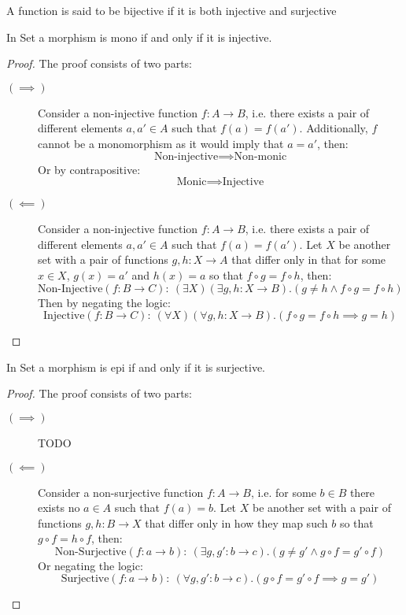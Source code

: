 \begin{definition}
  A function is said to be bijective if it is both injective and surjective
\end{definition}

\begin{theorem}
  In Set a morphism is mono if and only if it is injective.

  \begin{proof}
    The proof consists of two parts:
    \begin{description}
      \item[$(\implies)$] Consider a non-injective function $f:A\to B$, i.e.
        there exists a pair of different elements $a,a'\in A$ such that
        $f(a)=f(a')$. Additionally, $f$ cannot be a monomorphism as it would
        imply that $a=a'$, then:
        \[\text{Non-injective} \implies \text{Non-monic}\]
        Or by contrapositive:
        \[\text{Monic} \implies \text{Injective}\]
      \item[$(\impliedby)$] Consider a non-injective function $f:A\to B$, i.e.
        there exists a pair of different elements $a,a'\in A$ such that
        $f(a)=f(a')$. Let $X$ be another set with a pair of functions $g,
        h:X\to A$ that differ only in that for some $x\in X$, $g(x)=a'$ and
        $h(x)=a$ so that $f\circ g = f\circ h$, then:
        \[\text{Non-Injective}(f:B\to C):\ (\exists X)(\exists g,h:X\to
        B).(g \neq h \land f\circ g = f\circ h)\] Then by negating the logic:
        \[\text{Injective}(f:B\to C):\ (\forall X)(\forall g, h:X\to B).(f\circ
        g = f\circ h \implies g=h)\]
    \end{description}
  \end{proof}
\end{theorem}

\begin{theorem}
  In Set a morphism is epi if and only if it is surjective.

  \begin{proof}
    The proof consists of two parts:
    \begin{description}
      \item[$(\implies)$] TODO
      \item[$(\impliedby)$] Consider a non-surjective function $f:A\to B$, i.e.
        for some $b\in B$ there exists no $a\in A$ such that $f(a) = b$. Let $X$
        be another set with a pair of functions $g, h:B\to X$ that differ only
        in how they map such $b$ so that $g\circ f = h\circ f$, then:
        \[\text{Non-Surjective}(f:a\to b):\ (\exists g, g':b\to c).(g \neq
        g' \land g\circ f = g'\circ f)\]
        Or negating the logic:
        \[\text{Surjective}(f:a\to b):\ (\forall g, g':b\to c).(g\circ f =
          g'\circ f \implies g=g')\]
    \end{description}
  \end{proof}
\end{theorem}

